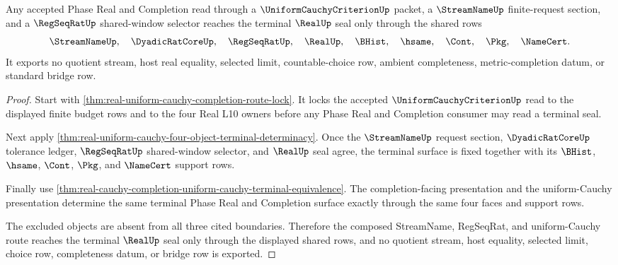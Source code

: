 \begin{theorem}
\label{thm:real-uniform-cauchy-stream-regseq-terminal-seal-nonescape}
Any accepted Phase Real and Completion read through a
$\UniformCauchyCriterionUp$ packet, a $\StreamNameUp$ finite-request section,
and a $\RegSeqRatUp$ shared-window selector reaches the terminal $\RealUp$ seal
only through the shared rows
$$
\StreamNameUp,\quad \DyadicRatCoreUp,\quad \RegSeqRatUp,\quad \RealUp,\quad
\BHist,\quad \hsame,\quad \Cont,\quad \Pkg,\quad \NameCert .
$$
It exports no quotient stream, host real equality, selected limit,
countable-choice row, ambient completeness, metric-completion datum, or standard
bridge row.
\end{theorem}
\begin{proof}
Start with \autoref{thm:real-uniform-cauchy-completion-route-lock}. It locks the
accepted $\UniformCauchyCriterionUp$ read to the displayed finite budget rows and
to the four Real L10 owners before any Phase Real and Completion consumer may
read a terminal seal.

Next apply
\autoref{thm:real-uniform-cauchy-four-object-terminal-determinacy}. Once the
$\StreamNameUp$ request section, $\DyadicRatCoreUp$ tolerance ledger,
$\RegSeqRatUp$ shared-window selector, and $\RealUp$ seal agree, the terminal
surface is fixed together with its $\BHist$, $\hsame$, $\Cont$, $\Pkg$, and
$\NameCert$ support rows.

Finally use
\autoref{thm:real-cauchy-completion-uniform-cauchy-terminal-equivalence}. The
completion-facing presentation and the uniform-Cauchy presentation determine the
same terminal Phase Real and Completion surface exactly through the same four
faces and support rows.

The excluded objects are absent from all three cited boundaries. Therefore the
composed StreamName, RegSeqRat, and uniform-Cauchy route reaches the terminal
$\RealUp$ seal only through the displayed shared rows, and no quotient stream,
host equality, selected limit, choice row, completeness datum, or bridge row is
exported.
\end{proof}
